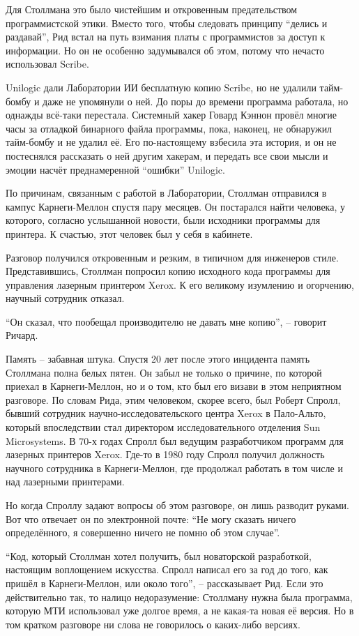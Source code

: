 Для Столлмана это было чистейшим и откровенным предательством программистской этики. Вместо того, чтобы следовать принципу ``делись и раздавай'', Рид встал на путь взимания платы с программистов за доступ к информации. Но он не особенно задумывался об этом, потому что нечасто использовал Scribe.

Unilogic дали Лаборатории ИИ бесплатную копию Scribe, но не удалили тайм-бомбу и даже не упомянули о ней. До поры до времени программа работала, но однажды всё-таки перестала. Системный хакер Говард Кэннон провёл многие часы за отладкой бинарного файла программы, пока, наконец, не обнаружил тайм-бомбу и не удалил её. Его по-настоящему взбесила эта история, и он не постеснялся рассказать о ней другим хакерам, и передать все свои мысли и эмоции насчёт преднамеренной ``ошибки'' Unilogic.

По причинам, связанным с работой в Лаборатории, Столлман отправился в кампус Карнеги-Меллон спустя пару месяцев. Он постарался найти человека, у которого, согласно услышанной новости, были исходники программы для принтера. К счастью, этот человек был у себя в кабинете.

Разговор получился откровенным и резким, в типичном для инженеров стиле. Представившись, Столлман попросил копию исходного кода программы для управления лазерным принтером Xerox. К его великому изумлению и огорчению, научный сотрудник отказал.

``Он сказал, что пообещал производителю не давать мне копию'', -- говорит Ричард.

Память -- забавная штука. Спустя 20 лет после этого инцидента память Столлмана полна белых пятен. Он забыл не только о причине, по которой приехал в Карнеги-Меллон, но и о том, кто был его визави в этом неприятном разговоре. По словам Рида, этим человеком, скорее всего, был Роберт Спролл, бывший сотрудник научно-исследовательского центра Xerox в Пало-Альто, который впоследствии стал директором исследовательного отделения Sun Microsystems. В 70-х годах Спролл был ведущим разработчиком программ для лазерных принтеров Xerox. Где-то в 1980 году Спролл получил должность научного сотрудника в Карнеги-Меллон, где продолжал работать в том числе и над лазерными принтерами.

Но когда Спроллу задают вопросы об этом разговоре, он лишь разводит руками. Вот что отвечает он по электронной почте: ``Не могу сказать ничего определённого, я совершенно ничего не помню об этом случае''.

``Код, который Столлман хотел получить, был новаторской разработкой, настоящим воплощением искусства. Спролл написал его за год до того, как пришёл в Карнеги-Меллон, или около того'', -- рассказывает Рид. Если это действительно так, то налицо недоразумение: Столлману нужна была программа, которую МТИ использовал уже долгое время, а не какая-та новая её версия. Но в том кратком разговоре ни слова не говорилось о каких-либо версиях.

